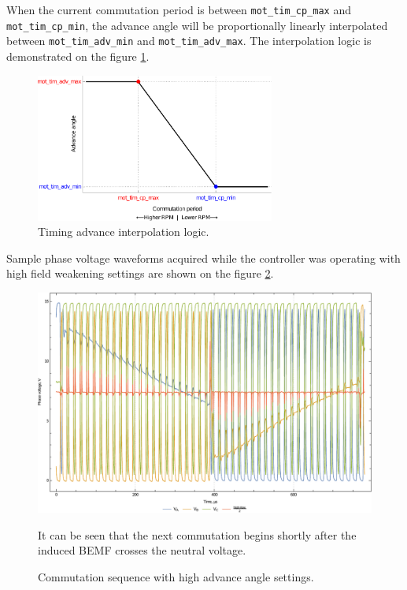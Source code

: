 \documentclass{zubaxdoc}
\begin{document}
When the current commutation period is between \verb|mot_tim_cp_max| and \verb|mot_tim_cp_min|,
the advance angle will be proportionally linearly interpolated between
\verb|mot_tim_adv_min| and \verb|mot_tim_adv_max|.
The interpolation logic is demonstrated on the figure \ref{timing_advance_interpolation_plot}.

\begin{figure}[hbt]
    \centering
	\includegraphics[width=0.7\textwidth]{timing_advance_interpolation_plot}
	\caption{Timing advance interpolation logic.
	\label{timing_advance_interpolation_plot}}
\end{figure}

Sample phase voltage waveforms acquired while the controller was operating with high field
weakening settings are shown on the figure \ref{phase_voltages_at_high_advance_angle}.

\begin{figure}[hbtp]
    \centering
	\includegraphics[width=\textwidth]{phase_voltages_at_high_advance_angle}
	\caption{Commutation sequence with high advance angle settings.
	\label{phase_voltages_at_high_advance_angle}}
	It can be seen that the next commutation begins shortly after the induced BEMF
	crosses the neutral voltage.
\end{figure}
\end{document}

